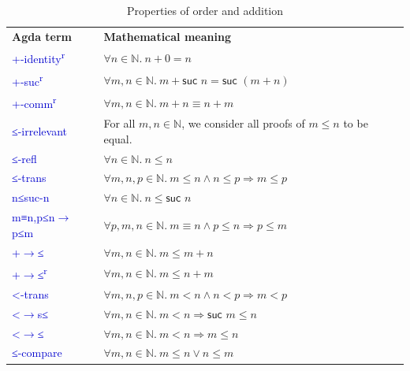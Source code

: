 \documentclass[12pt,a4paper]{report}
\theoremstyle{definition}
\newcommand{\mb}[1]{\textcolor{mediumblue}{#1}}
\newcommand{\mbt}[1]{\mb{\textsf{#1}}}
\newcommand{\bN}{\ensuremath{\mathbb{N}}}
\begin{document}
    \begin{table}[H]
        \centering
        \begin{tabular}{|l|l|}
            \hline
            \textbf{Agda term} & \textbf{Mathematical meaning} \\
            \hhline{|=|=|}
            \mbt{+-identity\textsuperscript{r}} & $\forall n \in \bN.\ n + 0 = n$ \\
            \hline
            \mbt{+-suc\textsuperscript{r}}& $\forall m, n \in \bN.\ m + \textsf{suc } n = \textsf{suc } (m + n)$ \\
            \hline
            \mbt{+-comm\textsuperscript{r}} & $\forall m, n \in \bN.\ m + n \equiv n + m$ \\
            \hline
            \mbt{≤-irrelevant} & For all $m, n \in \bN$, we consider all proofs of $m \leq n$ to be equal. \\
            \hline
            \mbt{≤-refl} & $\forall n \in \bN.\ n \leq n$ \\
            \hline
            \mbt{≤-trans} & $\forall m, n, p \in \bN.\ m \leq n \land n \leq p \Rightarrow m \leq p$ \\
            \hline
            \mbt{n≤suc-n} & $\forall n \in \bN.\ n \leq \textsf{suc } n$ \\
            \hline
            \mbt{m≡n,p≤n}\mb{$\to$}\mbt{p≤m} & $\forall p, m, n \in \bN.\ m \equiv n \land p \leq n \Rightarrow p \leq m$ \\
            \hline
            \mbt{+}\mb{$\to$}\mbt{≤} & $\forall m, n \in \bN.\ m \leq m + n$ \\
            \hline
            \mbt{+}\mb{$\to$}\mb{≤\textsuperscript{r}} & $\forall m, n \in \bN.\ m \leq n + m$ \\
            \hline
            \mbt{<-trans} & $\forall m, n, p \in \bN.\ m < n \land n < p \Rightarrow m < p$ \\
            \hline
            \mbt{<}\mb{$\to$}\mbt{s≤} & $\forall m, n \in \bN.\ m < n \Rightarrow \textsf{suc } m \leq n$ \\
            \hline
            \mbt{<}\mb{$\to$}\mbt{≤} & $\forall m, n \in \bN.\ m < n \Rightarrow m \leq n$ \\
            \hline
            \mbt{≤-compare} & $\forall m, n \in \bN.\ m \leq n \lor n \leq m$ \\
            \hline
        \end{tabular}
        \caption{Properties of order and addition}
        \label{tab: properties}
    \end{table}
\end{document}
